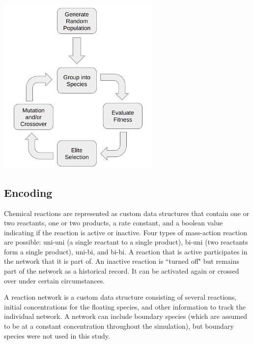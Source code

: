 \documentclass[12pt]{report}
\begin{document}
\begin{center}
    \includegraphics[width=8cm]{images/algo_description_crossover.png}
    \label{fig:algo_description_crossover}
\end{center}
\subsection{Encoding}
Chemical reactions are represented as custom data structures that contain one or two reactants, one or two products, a rate constant, and a boolean value indicating if the reaction is active or inactive. Four types of mass-action reaction are possible: uni-uni (a single reactant to a single product), bi-uni (two reactants form a single product), uni-bi, and bi-bi. A reaction that is active participates in the network that it is part of. An inactive reaction is ``turned off" but remains part of the network as a historical record. It can be activated again or crossed over under certain circumstances. 

A reaction network is a custom data structure consisting of several reactions, initial concentrations for the floating species, and other information to track the individual network. A network can include boundary species (which are assumed to be at a constant concentration throughout the simulation), but boundary species were not used in this study.
\end{document}
